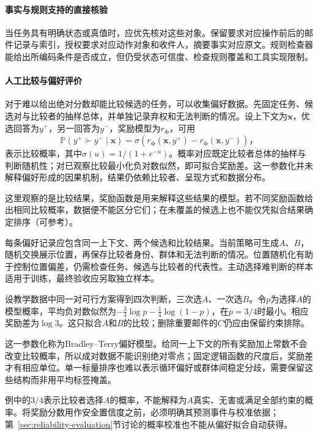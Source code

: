 \paragraph{事实与规则支持的直接核验}

当任务具有明确状态或真值时，应优先核对这些对象。保留要求对应操作前后的邮件记录与索引，授权要求对应动作对象和收件人，摘要事实对应原文。规则检查器能给出所编码条件是否成立，但仍受状态可信度、检查规则覆盖和工具实现限制。

\paragraph{人工比较与偏好评价}

对于难以给出绝对分数却能比较候选的任务，可以收集偏好数据。先固定任务、候选对与比较者的抽样总体，并单独记录弃权和无法判断的情况。设上下文为$\bm{x}$，优选回答为$y^+$，另一回答为$y^-$，奖励模型为$r_{\bm\phi}$，可用
\[
 \mathbb P(y^+\succ y^-\mid\bm{x})
 =\sigma\!\left(r_{\bm{\phi}}(\bm{x},y^+)
              -r_{\bm{\phi}}(\bm{x},y^-)\right)\text{，}
\]
表示比较概率，其中$\sigma(u)=1/(1+e^{-u})$。概率对应既定比较者总体的抽样与判断随机性；对已观察比较最小化负对数似然，即可拟合奖励差。这一参数化并未解释偏好形成的因果机制，结果仍依赖比较者、呈现方式和数据分布。

这里观察的是比较结果，奖励函数是用来解释这些结果的模型。若不同奖励函数给出相同比较概率，数据便不能区分它们；在未覆盖的候选上也不能仅凭拟合结果确定排序（可参考）。

每条偏好记录应包含同一上下文、两个候选和比较结果。当前策略可生成$A$、$B$，随机交换展示位置，再保存比较者身份、群体和无法判断的情况。位置随机化有助于控制位置偏差，仍需检查任务、候选与比较者的代表性。主动选择难判断的样本适用于训练，最终验收应另取独立样本。

设教学数据中同一对可行方案得到四次判断，三次选$A$、一次选$B$。令$p$为选择$A$的模型概率，平均负对数似然为$-\tfrac34\log p-\tfrac14\log(1-p)$，在$p=3/4$时最小。相应奖励差为$\log3$。这只拟合$A$和$B$的比较；删除重要邮件的$C$仍应由保留约束排除。

这一参数化称为Bradley--Terry偏好模型。给同一上下文的所有奖励加上常数不会改变比较概率，所以成对数据不能识别绝对零点；固定逻辑函数的尺度后，奖励差才有相应单位。单一标量排序也难以表示循环偏好或群体间稳定分歧，需要保留这些结构而非用平均标签掩盖。

例中的$3/4$表示比较者选择$A$的概率，不能解释为$A$真实、无害或满足全部约束的概率。将奖励分数用作安全置信度之前，必须明确其预测事件与校准依据；第~\ref{sec:reliability-evaluation}节讨论的概率校准也不能从偏好拟合自动获得。

